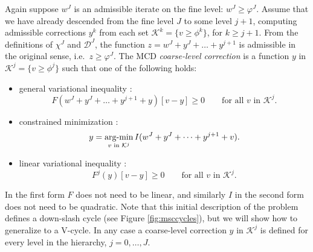 \documentclass[letterpaper,final,12pt,reqno]{amsart}
\theoremstyle{claim}
\numberwithin{equation}{section}
\numberwithin{figure}{section}
\numberwithin{table}{section}
\numberwithin{theorem}{section}
\begin{document}
Again suppose $w^J$ is an admissible iterate on the fine level: $w^J\ge \varphi^J$.  Assume that we have already descended from the fine level $J$ to some level $j+1$, computing admissible corrections $y^k$ from each set $\mathcal{K}^k=\{v\ge \phi^k\}$, for $k\ge j+1$.  From the definitions of $\chi^J$ and $\mathcal{D}^J$, the function $z = w^J+y^J+\dots+y^{j+1}$ is admissible in the original sense, i.e.~$z\ge \varphi^J$.  The MCD \emph{coarse-level correction} is a function $y$ in $\mathcal{K}^j=\{v\ge \phi^j\}$ such that one of the following holds:
\begin{itemize}
\item general variational inequality \cite{Tai2003}:
\begin{equation}
  F(w^J+y^J+\dots+y^{j+1}+y)[v - y] \ge 0 \qquad \text{for all } v \text{ in } \mathcal{K}^j.  \label{eq:mcdvi}
\end{equation}
\item constrained minimization \cite{Tai2003}:
\begin{equation}
  y = \mathop{\mathrm{arg\text{-}min}}_{v \text{ in } \mathcal{K}^j} I(w^J+y^J+\dots+y^{j+1}+v).  \label{eq:mcdminimization}
\end{equation}
\item linear variational inequality \cite{GraeserKornhuber2009}:
\begin{equation}
  F^j(y)[v - y] \ge 0 \qquad \text{for all } v \text{ in } \mathcal{K}^j.   \label{eq:mcdvilinear}
\end{equation}
\end{itemize}
In the first form $F$ does not need to be linear, and similarly $I$ in the second form does not need to be quadratic.  Note that this initial description of the problem defines a down-slash cycle (see Figure \ref{fig:msccycles}), but we will show how to generalize to a V-cycle.  In any case a coarse-level correction $y$ in $\mathcal{K}^j$ is defined for every level in the hierarchy, $j=0,\dots,J$.
\end{document}
